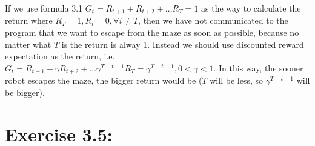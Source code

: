 \documentclass[10pt,letterpaper]{article}
\begin{document}
If we use formula 3.1 $G_t = R_{t+1} + R_{t+2} + ... R_{T} = 1$ as the way to calculate the return where $R_{T}=1, R_i=0, \forall i\neq T$, then we have not communicated to the program that we want to escape from the maze as soon as possible, because no matter what $T$ is the return is alway 1. Instead we should use discounted reward expectation as the return, i.e. $G_t = R_{t+1} + \gamma R_{t+2} + ... \gamma^{T-t-1}R_{T} = \gamma^{T-t-1}, 0<\gamma<1$. In this way, the sooner robot escapes the maze, the bigger return would be ($T$ will be less, so $\gamma^{T-t-1}$ will be bigger).

\section*{Exercise 3.5: }
\label{3.5}


\clearpage
\end{document}
